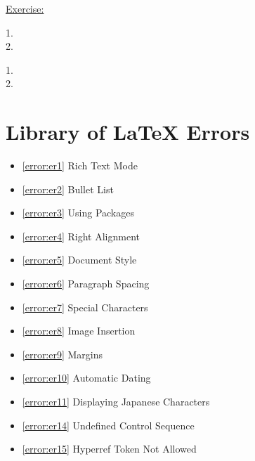 \documentclass[12pt]{article}
\begin{document}
\vspace{0.5em}
\begin{addmargin}[1cm]{0cm}
\color{gray}
\underline{Exercise:}

1. 
\\2. 

\color{black}\vspace{0.5em}

1.
\\2.

\end{addmargin}




















\newpage\section{Library of LaTeX Errors}
\begin{itemize}
\renewcommand{\labelitemi}{}
    \item \ref{error:er1} Rich Text Mode 
    \item \ref{error:er2} Bullet List 
    \item \ref{error:er3} Using Packages
    \item \ref{error:er4} Right Alignment
    \item \ref{error:er5} Document Style
    \item \ref{error:er6} Paragraph Spacing
    \item \ref{error:er7} Special Characters
    \item \ref{error:er8} Image Insertion
    \item \ref{error:er9} Margins
    \item \ref{error:er10} Automatic Dating
    \item \ref{error:er11} Displaying Japanese Characters
    \item \ref{error:er14} Undefined Control Sequence
    \item \ref{error:er15} Hyperref Token Not Allowed
\end{itemize}
\end{document}
